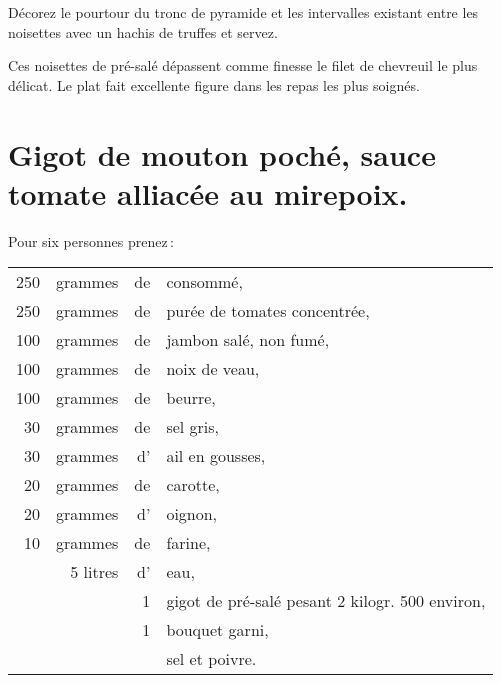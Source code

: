 Décorez le pourtour du tronc de pyramide et les intervalles existant entre les
noisettes avec un hachis de truffes et servez.

Ces noisettes de pré-salé dépassent comme finesse le filet de chevreuil le plus
délicat. Le plat fait excellente figure dans les repas les plus soignés.

\section*{\centering Gigot de mouton poché, sauce tomate alliacée au mirepoix.}
{}

Pour six personnes prenez :

\medskip

\footnotesize
\begin{longtable}{rrrp{16em}}
    250 & grammes & de & consommé,                                                                        \\
    250 & grammes & de & purée de tomates concentrée,                                                     \\
    100 & grammes & de & jambon salé, non fumé,                                                           \\
    100 & grammes & de & noix de veau,                                                                    \\
    100 & grammes & de & beurre,                                                                          \\
     30 & grammes & de & sel gris,                                                                        \\
     30 & grammes & d’ & ail en gousses,                                                                  \\
     20 & grammes & de & carotte,                                                                         \\
     20 & grammes & d' & oignon,                                                                          \\
     10 & grammes & de & farine,                                                                          \\
       & 5 litres & d' & eau,                                                                             \\
        &         &  1 & gigot de pré-salé pesant 2 kilogr. 500 environ,                                  \\
        &         &  1 & bouquet garni,                                                                   \\
        &         &    & sel et poivre.                                                                   \\
\end{longtable}
\normalsize


